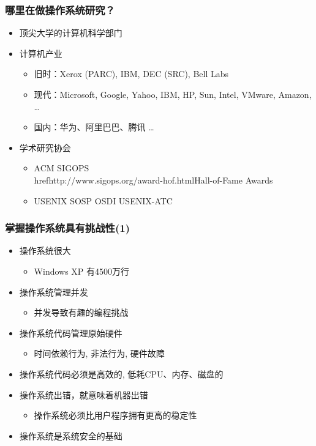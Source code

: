 \documentclass[UTF8]{ctexbeamer}
\begin{document}
    
\begin{frame}
    \frametitle{哪里在做操作系统研究？}
    \begin{itemize}
        \item 顶尖大学的计算机科学部门
        \item 计算机产业
        \begin{itemize}
            \item 旧时：Xerox (PARC), IBM, DEC (SRC), Bell Labs
            \item 现代：Microsoft, Google, Yahoo, IBM, HP, Sun, Intel, VMware, Amazon,  …
            \item 国内：华为、阿里巴巴、腾讯 …
        \end{itemize}

        \item 学术研究协会
        \begin{itemize}
            \item ACM SIGOPS \\href{http://www.sigops.org/award-hof.html}{Hall-of-Fame Awards} 
            \item USENIX SOSP OSDI  USENIX-ATC
        \end{itemize}
    \end{itemize}
\end{frame}

    
\begin{frame}
    \frametitle{掌握操作系统具有挑战性(1)}
    \begin{itemize}
        \item 操作系统很大
            \begin{itemize}
                \item Windows XP 有4500万行
            \end{itemize}
        \item 操作系统管理并发
            \begin{itemize}
                \item 并发导致有趣的编程挑战
            \end{itemize}
        \item 操作系统代码管理原始硬件
            \begin{itemize}
                \item 时间依赖行为, 非法行为, 硬件故障
            \end{itemize}
        \item 操作系统代码必须是高效的, 低耗CPU、内存、磁盘的
        \item 操作系统出错，就意味着机器出错
            \begin{itemize}
                \item 操作系统必须比用户程序拥有更高的稳定性
            \end{itemize}
        \item 操作系统是系统安全的基础
    \end{itemize}
\end{frame}
\end{document}
